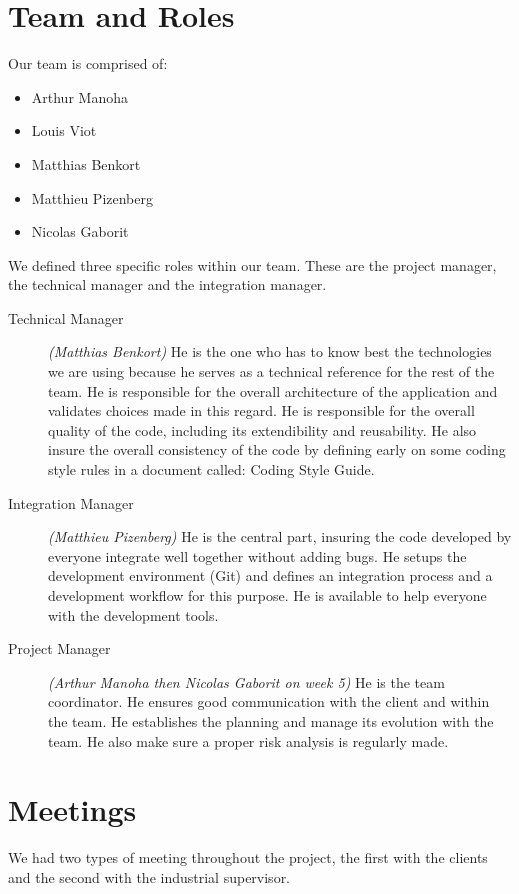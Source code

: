\section{Team and Roles}

Our team  is comprised of:
\begin{itemize}
\item Arthur Manoha
\item Louis Viot
\item Matthias Benkort
\item Matthieu Pizenberg
\item Nicolas Gaborit
\end{itemize}


We defined three specific roles within our team. These are the project
manager, the technical manager and the integration manager.

\begin{description}
\item[Technical Manager] \emph{(Matthias Benkort)} He is the one who
  has to know best the technologies we are using because he serves as
  a technical reference for the rest of the team. He is responsible
  for the overall architecture of the application and validates
  choices made in this regard. He is responsible for the overall
  quality of the code, including its extendibility and reusability. He
  also insure the overall consistency of the code by defining early on
  some coding style rules in a document called: Coding Style Guide.

\item[Integration Manager] \emph{(Matthieu Pizenberg)} He is the
  central part, insuring the code developed by everyone integrate well
  together without adding bugs. He setups the development environment
  (Git) and defines an integration process and a development workflow
  for this purpose. He is available to help everyone with the
  development tools.

\item[Project Manager] \emph{(Arthur Manoha then Nicolas Gaborit on
    week 5)} He is the team coordinator. He ensures good communication
  with the client and within the team. He establishes the planning and
  manage its evolution with the team. He also make sure a proper risk
  analysis is regularly made.
\end{description}


\section{Meetings}
We had two types of meeting throughout the project, the first with the
clients and the second with the industrial supervisor.

